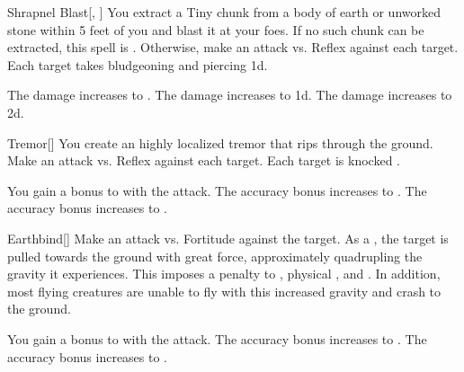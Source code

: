 \lowercase{\hypertarget{spell:Shrapnel Blast}{}}\label{spell:Shrapnel Blast}
\begin{freeability}[Rank 1]{\hypertarget{spell:Shrapnel Blast}{Shrapnel Blast}}[, ]
You extract a Tiny chunk from a body of earth or unworked stone within 5 feet of you and blast it at your foes.
If no such chunk can be extracted, this spell is .
Otherwise, make an attack vs. Reflex against each target.
\hit Each target takes bludgeoning and piercing  \minus1d.

\rankline
{} The damage increases to .
 The damage increases to  \plus1d.
 The damage increases to  \plus2d.
\end{freeability}
\vspace{0.25em}



\lowercase{\hypertarget{spell:Tremor}{}}\label{spell:Tremor}
\begin{freeability}[Rank 1]{\hypertarget{spell:Tremor}{Tremor}}[]
You create an highly localized tremor that rips through the ground.
Make an attack vs. Reflex against each target.
\hit Each target is knocked .

\rankline
{} You gain a  bonus to  with the attack.
 The accuracy bonus increases to .
 The accuracy bonus increases to .
\end{freeability}
\vspace{0.25em}



\lowercase{\hypertarget{spell:Earthbind}{}}\label{spell:Earthbind}
\begin{freeability}[Rank 2]{\hypertarget{spell:Earthbind}{Earthbind}}[]
Make an attack vs. Fortitude against the target.
\hit As a , the target is pulled towards the ground with great force, approximately quadrupling the gravity it experiences.
This imposes a  penalty to , physical , and .
In addition, most flying creatures are unable to fly with this increased gravity and crash to the ground.

\rankline
{} You gain a  bonus to  with the attack.
 The accuracy bonus increases to .
 The accuracy bonus increases to .
\end{freeability}
\vspace{0.25em}



